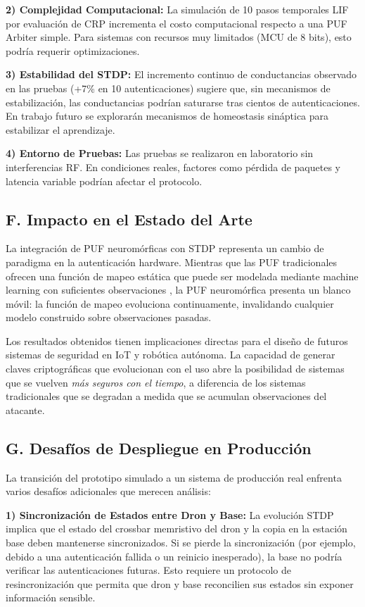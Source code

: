 \textbf{2) Complejidad Computacional:} La simulación de 10 pasos temporales LIF por evaluación de CRP incrementa el costo computacional respecto a una PUF Arbiter simple. Para sistemas con recursos muy limitados (MCU de 8 bits), esto podría requerir optimizaciones.

\textbf{3) Estabilidad del STDP:} El incremento continuo de conductancias observado en las pruebas (+7\% en 10 autenticaciones) sugiere que, sin mecanismos de estabilización, las conductancias podrían saturarse tras cientos de autenticaciones. En trabajo futuro se explorarán mecanismos de homeostasis sináptica para estabilizar el aprendizaje.

\textbf{4) Entorno de Pruebas:} Las pruebas se realizaron en laboratorio sin interferencias RF. En condiciones reales, factores como pérdida de paquetes y latencia variable podrían afectar el protocolo.

\subsection*{F. Impacto en el Estado del Arte}

La integración de PUF neuromórficas con STDP representa un cambio de paradigma en la autenticación hardware. Mientras que las PUF tradicionales ofrecen una función de mapeo estática que puede ser modelada mediante machine learning con suficientes observaciones \cite{suh2007puf}, la PUF neuromórfica presenta un blanco móvil: la función de mapeo evoluciona continuamente, invalidando cualquier modelo construido sobre observaciones pasadas.

Los resultados obtenidos tienen implicaciones directas para el diseño de futuros sistemas de seguridad en IoT y robótica autónoma. La capacidad de generar claves criptográficas que evolucionan con el uso abre la posibilidad de sistemas que se vuelven \textit{más seguros con el tiempo}, a diferencia de los sistemas tradicionales que se degradan a medida que se acumulan observaciones del atacante.

\subsection*{G. Desafíos de Despliegue en Producción}

La transición del prototipo simulado a un sistema de producción real enfrenta varios desafíos adicionales que merecen análisis:

\textbf{1) Sincronización de Estados entre Dron y Base:} La evolución STDP implica que el estado del crossbar memristivo del dron y la copia en la estación base deben mantenerse sincronizados. Si se pierde la sincronización (por ejemplo, debido a una autenticación fallida o un reinicio inesperado), la base no podría verificar las autenticaciones futuras. Esto requiere un protocolo de resincronización que permita que dron y base reconcilien sus estados sin exponer información sensible.

